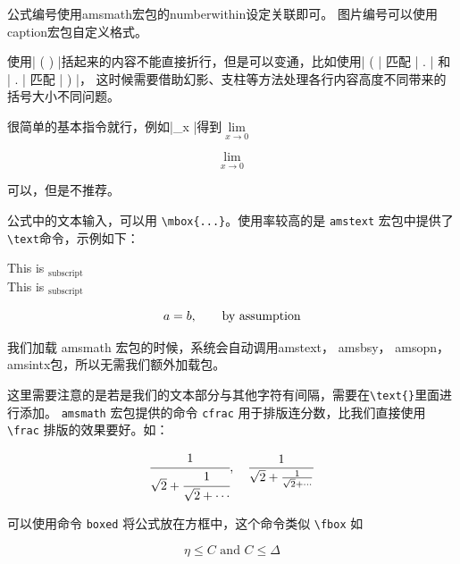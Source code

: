 
公式编号使用amsmath宏包的numberwithin设定关联即可。
图片编号可以使用caption宏包自定义格式。

使用| \left( \right) |括起来的内容不能直接折行，但是可以变通，比如使用| \left( | 匹配 | \right. | 和 | \left. | 匹配 | \right) |，
这时候需要借助幻影、支柱等方法处理各行内容高度不同带来的括号大小不同问题。

很简单的基本指令就行，例如|\lim\limits_{x }|得到$\lim\limits_{x \to 0}$
\begin{example}
\[
  \lim\limits_{x \to 0}
\]
\end{example}

可以，但是不推荐。

公式中的文本输入，可以用 \verb|\mbox{...}|。使用率较高的是 \texttt{amstext} 宏包中提供了\verb|\text|命令，示例如下：
\begin{example}
\begin{center}
  This is $_{\text{subscript}}$\\
  This is $_{\mbox{subscript}}$
\end{center}
\[a = b, \text{\qquad by assumption}\]
\end{example}

	我们加载 amsmath 宏包的时候，系统会自动调用amstext， amsbsy， amsopn，
	amsintx包，所以无需我们额外加载包。

 这里需要注意的是若是我们的文本部分与其他字符有间隔，需要在\verb|\text{}|里面进行添加。
{}
\verb|amsmath| 宏包提供的命令 \verb|cfrac| 用于排版连分数，比我们直接使用 \verb|\frac| 排版的效果要好。如：
\begin{example}
\[
  \cfrac{1}{\sqrt 2 + \cfrac{1}{\sqrt 2 +\dotsb}},\quad
  \frac{1}{\sqrt 2 + \frac{1}{\sqrt 2 +\dotsb}}
\]
\end{example}




可以使用命令 \verb|boxed| 将公式放在方框中，这个命令类似 \verb|\fbox| 如
\begin{example}
\[
  \boxed{\eta \leq C \text{ and } C \leq \Delta}
\]
\end{example}

